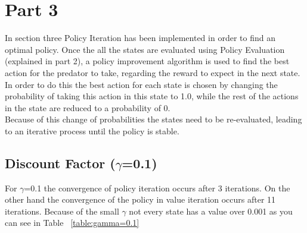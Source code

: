 \documentclass[11pt]{article}
\begin{document}
\section{Part 3}
In section three Policy Iteration has been implemented in order to find an optimal policy.
Once the all the states are evaluated using  Policy Evaluation (explained in part 2), a policy improvement algorithm is used to find the best action for the predator to take, regarding the reward to expect in the next state.\\
In order to do this the best action for each state is chosen by changing the probability of taking this action in this state to 1.0, while the rest of the actions in the state are reduced to a probability of 0. \\
Because of this change of probabilities the states need to be re-evaluated, leading to an iterative process until the policy is stable.


\subsection{Discount Factor ($\gamma$=0.1)}

For $\gamma$=0.1 the convergence of policy iteration occurs after 3 iterations. On the other hand the convergence of the policy in value iteration occurs after 11 iterations. Because of the small $\gamma$ not every state has a value over 0.001 as you can see in Table ~\ref{table:gamma=0.1} 
\end{document}
